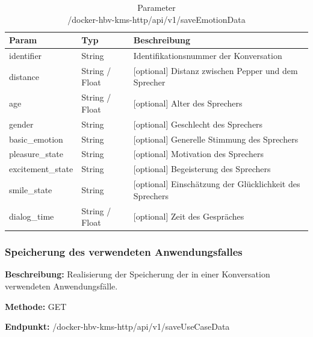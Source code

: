\begin{table}[H]
    \label{table:/docker-hbv-kms-http/api/v1/saveEmotionData}
    \caption{Parameter \\/docker-hbv-kms-http/api/v1/saveEmotionData}
    \setlength{\tabcolsep}{3pt}
    \begin{tabular}{p{100pt}p{80pt}p{200pt}}
        \toprule
        Param             & Typ            & Beschreibung                                            \\
        \midrule
        identifier        & String         & Identifikationsnummer der Konversation                  \\
        distance          & String / Float & [optional] Distanz zwischen Pepper und dem Sprecher     \\
        age               & String / Float & [optional] Alter des Sprechers                          \\
        gender            & String         & [optional] Geschlecht des Sprechers                     \\
        basic\_emotion    & String         & [optional] Generelle Stimmung des Sprechers             \\
        pleasure\_state   & String         & [optional] Motivation des Sprechers                     \\
        excitement\_state & String         & [optional] Begeisterung des Sprechers                   \\
        smile\_state      & String         & [optional] Einschätzung der Glücklichkeit des Sprechers \\
        dialog\_time      & String / Float & [optional] Zeit des Gespräches                          \\
        \bottomrule
    \end{tabular}
\end{table}

\dotfill

\subsubsection{Speicherung des verwendeten Anwendungsfalles}
\label{sec:api-saveUseCaseData}
\textbf{Beschreibung:} Realisierung der Speicherung der in einer Konversation verwendeten Anwendungsfälle.

\textbf{Methode:} GET

\textbf{Endpunkt:} /docker-hbv-kms-http/api/v1/saveUseCaseData

